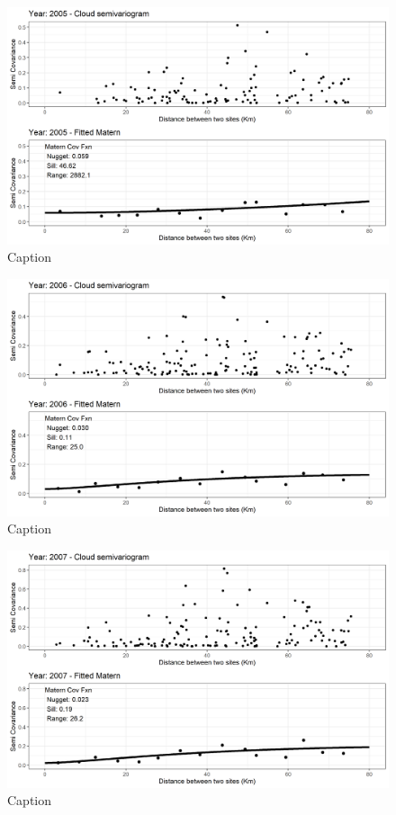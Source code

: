 \begin{figure}
    \centering
    \includegraphics{Figures/EmpiricalVariograms/Empirical_Variogram_2005.png}
    \caption{Caption}
    \label{fig:my_label}
\end{figure}

\begin{figure}
    \centering
    \includegraphics{Figures/EmpiricalVariograms/Empirical_Variogram_2006.png}
    \caption{Caption}
    \label{fig:my_label}
\end{figure}

\begin{figure}
    \centering
    \includegraphics{Figures/EmpiricalVariograms/Empirical_Variogram_2007.png}
    \caption{Caption}
    \label{fig:my_label}
\end{figure}

